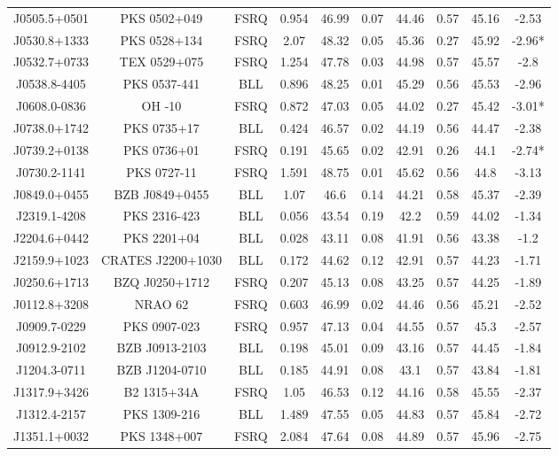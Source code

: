 \documentclass[12pt]{article}
\begin{document}
\begin{landscape}
\begin{longtable}{cccccccccc}
J0505.5+0501 & PKS 0502+049 & FSRQ & 0.954 & 46.99 & 0.07 & 44.46 & 0.57 & 45.16 & -2.53 \\
J0530.8+1333 & PKS 0528+134 & FSRQ & 2.07 & 48.32 & 0.05 & 45.36 & 0.27 & 45.92 & -2.96* \\
J0532.7+0733 & TEX 0529+075 & FSRQ & 1.254 & 47.78 & 0.03 & 44.98 & 0.57 & 45.57 & -2.8 \\
J0538.8-4405 & PKS 0537-441 & BLL & 0.896 & 48.25 & 0.01 & 45.29 & 0.56 & 45.53 & -2.96 \\
J0608.0-0836 & OH -10 & FSRQ & 0.872 & 47.03 & 0.05 & 44.02 & 0.27 & 45.42 & -3.01* \\
J0738.0+1742 & PKS 0735+17 & BLL & 0.424 & 46.57 & 0.02 & 44.19 & 0.56 & 44.47 & -2.38 \\
J0739.2+0138 & PKS 0736+01 & FSRQ & 0.191 & 45.65 & 0.02 & 42.91 & 0.26 & 44.1 & -2.74* \\
J0730.2-1141 & PKS 0727-11 & FSRQ & 1.591 & 48.75 & 0.01 & 45.62 & 0.56 & 44.8 & -3.13 \\
J0849.0+0455 & BZB J0849+0455 & BLL & 1.07 & 46.6 & 0.14 & 44.21 & 0.58 & 45.37 & -2.39 \\
J2319.1-4208 & PKS 2316-423 & BLL & 0.056 & 43.54 & 0.19 & 42.2 & 0.59 & 44.02 & -1.34 \\
J2204.6+0442 & PKS 2201+04 & BLL & 0.028 & 43.11 & 0.08 & 41.91 & 0.56 & 43.38 & -1.2 \\
J2159.9+1023 & CRATES J2200+1030 & BLL & 0.172 & 44.62 & 0.12 & 42.91 & 0.57 & 44.23 & -1.71 \\
J0250.6+1713 & BZQ J0250+1712 & FSRQ & 0.207 & 45.13 & 0.08 & 43.25 & 0.57 & 44.25 & -1.89 \\
J0112.8+3208 & NRAO 62 & FSRQ & 0.603 & 46.99 & 0.02 & 44.46 & 0.56 & 45.21 & -2.52 \\
J0909.7-0229 & PKS 0907-023 & FSRQ & 0.957 & 47.13 & 0.04 & 44.55 & 0.57 & 45.3 & -2.57 \\
J0912.9-2102 & BZB J0913-2103 & BLL & 0.198 & 45.01 & 0.09 & 43.16 & 0.57 & 44.45 & -1.84 \\
J1204.3-0711 & BZB J1204-0710 & BLL & 0.185 & 44.91 & 0.08 & 43.1 & 0.57 & 43.84 & -1.81 \\
J1317.9+3426 & B2 1315+34A & FSRQ & 1.05 & 46.53 & 0.12 & 44.16 & 0.58 & 45.55 & -2.37 \\
J1312.4-2157 & PKS 1309-216 & BLL & 1.489 & 47.55 & 0.05 & 44.83 & 0.57 & 45.84 & -2.72 \\
J1351.1+0032 & PKS 1348+007 & FSRQ & 2.084 & 47.64 & 0.08 & 44.89 & 0.57 & 45.96 & -2.75 \\

\end{longtable}
\end{landscape}
\end{document}
